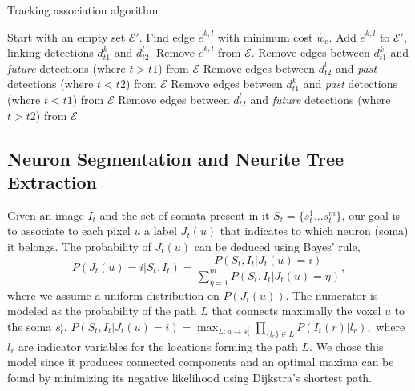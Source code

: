 \begin{algorithm}[b]
\caption{Tracking association algorithm}
\footnotesize
\begin{algorithmic}[100]
\STATE Start with an empty set $\mathcal{E}'$.
\REPEAT
\STATE Find edge $\hat e^{k,l}$ with minimum cost $\hat w_e$.
\STATE Add $\hat e^{k,l}$ to $\mathcal{E}'$, linking detections $d^k_{t1}$ and $d^l_{t2}$.
\STATE Remove $\hat e^{k,l}$ from $\mathcal{E}$.
\STATE Remove edges between $d^k_{t1}$ and {\em future} detections (where $t > t1$) from $\mathcal{E}$
\STATE Remove edges between $d^l_{t2}$ and {\em past} detections (where $t < t2$) from $\mathcal{E}$
\ELSE
\STATE Remove edges between $d^k_{t1}$ and {\em past} detections (where $t < t1$) from $\mathcal{E}$
\STATE Remove edges between $d^l_{t2}$ and {\em future} detections (where $t > t2$) from $\mathcal{E}$
\ENDIF
{}
\end{algorithmic}
\normalsize
\label{algo:greedy}
\end{algorithm}


\subsection{Neuron Segmentation and Neurite Tree Extraction}
\label{sec:segmentation}
\vspace{-2mm}
Given an  image $I_t$  and the set  of somata  present in it  $S_t=\{s_t^1 \dots
s_t^m \}$,  our goal is  to associate  to each pixel  $u$ a label  $J_t(u)$ that
indicates to which neuron (soma) it belongs.   The probability of $J_t(u)$ can be deduced
using Bayes' rule,
\begin{equation}
  \label{eq:bayes}
  P(J_t(u)=i|S_t,I_t) = \frac{P(S_t,I_t| J_t(u)=i)}{\sum_{\eta=1}^m P(S_t,I_t|J_t(u)=\eta)},
\end{equation}
\noindent where we assume a  uniform distribution on $P(J_t(u))$.  The numerator
is modeled as the probability of  the path $L$ that connects maximally the voxel
$u$ to  the soma $s_t^i$,  $ P(S_t,I_t| J_t(u)=i) =  \max_{L:u\rightarrow s_t^i}
\prod_{\{l_{r}\} \in L } P(I_t(r)|l_{r}),$ where $l_{r}$ are indicator variables
for the  locations forming the path $L$.  We chose this model  since it produces
connected  components and  an  optimal maxima  can  be found  by minimizing  its
negative likelihood using Dijkstra's shortest path.

